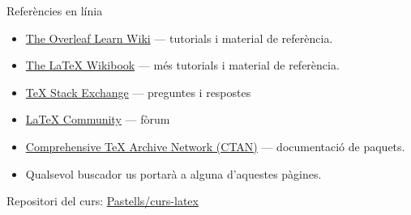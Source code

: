 
\begin{frame}{Referències en línia}
\begin{itemize}
\item \href{https://www.overleaf.com/learn}{The Overleaf Learn Wiki} --- tutorials i material de referència.
\item \href{http://en.wikibooks.org/wiki/LaTeX}{The \LaTeX{} Wikibook} --- més tutorials i material de referència.
\item \href{http://tex.stackexchange.com/}{\TeX{} Stack Exchange} --- preguntes i respostes
\item \href{http://www.latex-community.org/}{\LaTeX{} Community} --- fòrum
\item \href{http://ctan.org/}{Comprehensive \TeX{} Archive Network (CTAN)} --- documentació de paquets.
\item Qualsevol buscador us portarà a alguna d'aquestes pàgines.
\end{itemize}

Repositori del curs: \href{https://github.com/Pastells/curs-latex}{Pastells/curs-latex}

\end{frame}







